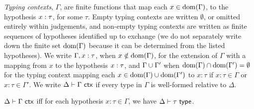 \emph{Typing contexts}, $\Gamma$, are finite functions that map each $x \in \text{dom}(\Gamma)$, to the hypothesis $x : \tau$, for some $\tau$. Empty typing contexts are written $\emptyset$, or omitted entirely within judgements, and non-empty typing contexts are written as finite sequences of hypotheses identified up to exchange (we do not separately write down the finite set $\text{dom}(\Gamma)$ because it can be determined from the listed hypotheses). We write $\Gamma, x : \tau$, when $x \notin \text{dom}(\Gamma)$, for the extension of $\Gamma$ with a mapping from $x$ to the hypothesis $x : \tau$, and ${\Gamma}\cup{\Gamma'}$ when $\text{dom}(\Gamma) \cap \text{dom}(\Gamma') = \emptyset$ for the typing context mapping each $x \in \text{dom}(\Gamma) \cup \text{dom}(\Gamma')$ to $x : \tau$ if $x : \tau \in \Gamma$ or $x : \tau \in \Gamma'$. We write $\Delta \vdash \Gamma~\mathsf{ctx}$ if every type in $\Gamma$ is well-formed relative to $\Delta$.
\begin{definition}\label{def:isctxU}
$\Delta \vdash \Gamma~\mathsf{ctx}$ iff for each hypothesis $x : \tau \in \Gamma$, we have $\Delta \vdash \tau~\mathsf{type}$.
\end{definition}

